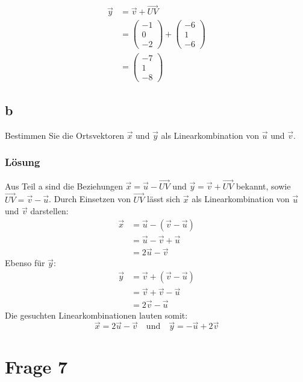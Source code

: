 \begin{align*}
    \vec{y} &= \vec{v} + \vec{UV} \\
    &= \begin{pmatrix}
        -1 \\ 0 \\ -2
    \end{pmatrix} + \begin{pmatrix}
        -6 \\ 1 \\ -6
    \end{pmatrix} \\
    &= \begin{pmatrix}
        -7 \\ 1 \\ -8
    \end{pmatrix}
\end{align*}

\subsection{b}

Bestimmen Sie die Ortsvektoren $\vec{x}$ und $\vec{y}$ als Linearkombination von $\vec{u}$ und $\vec{v}$.

\subsubsection*{Lösung}
Aus Teil a sind die Beziehungen $\vec{x} = \vec{u} - \vec{UV}$ und $\vec{y} = \vec{v} + \vec{UV}$ bekannt, sowie $\vec{UV} = \vec{v} - \vec{u}$. Durch Einsetzen von $\vec{UV}$ lässt sich $\vec{x}$ als Linearkombination von $\vec{u}$ und $\vec{v}$ darstellen:
\begin{align*}
    \vec{x} &= \vec{u} - (\vec{v} - \vec{u}) \\
    &= \vec{u} - \vec{v} + \vec{u} \\
    &= 2\vec{u} - \vec{v}
\end{align*}
Ebenso für $\vec{y}$:
\begin{align*}
    \vec{y} &= \vec{v} + (\vec{v} - \vec{u}) \\
    &= \vec{v} + \vec{v} - \vec{u} \\
    &= 2\vec{v} - \vec{u}
\end{align*}
Die gesuchten Linearkombinationen lauten somit:
\[
    \vec{x} = 2\vec{u} - \vec{v} \quad \text{und} \quad \vec{y} = - \vec{u} + 2\vec{v}
\]

\section{Frage 7}

